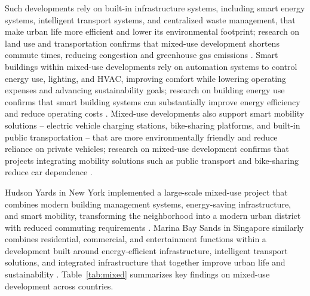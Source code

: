 \documentclass[journal]{IEEEtran}
\begin{document}
Such developments rely on built-in infrastructure systems, including smart energy systems, intelligent transport systems, and centralized waste management, that make urban life more efficient and lower its environmental footprint; research on land use and transportation confirms that mixed-use development shortens commute times, reducing congestion and greenhouse gas emissions \cite{r58}. Smart buildings within mixed-use developments rely on automation systems to control energy use, lighting, and HVAC, improving comfort while lowering operating expenses and advancing sustainability goals; research on building energy use confirms that smart building systems can substantially improve energy efficiency and reduce operating costs \cite{r59}. Mixed-use developments also support smart mobility solutions -- electric vehicle charging stations, bike-sharing platforms, and built-in public transportation -- that are more environmentally friendly and reduce reliance on private vehicles; research on mixed-use development confirms that projects integrating mobility solutions such as public transport and bike-sharing reduce car dependence \cite{r60}.

Hudson Yards in New York implemented a large-scale mixed-use project that combines modern building management systems, energy-saving infrastructure, and smart mobility, transforming the neighborhood into a modern urban district with reduced commuting requirements \cite{r61}. Marina Bay Sands in Singapore similarly combines residential, commercial, and entertainment functions within a development built around energy-efficient infrastructure, intelligent transport solutions, and integrated infrastructure that together improve urban life and sustainability \cite{r62}. Table~\ref{tab:mixed} summarizes key findings on mixed-use development across countries.
\end{document}
